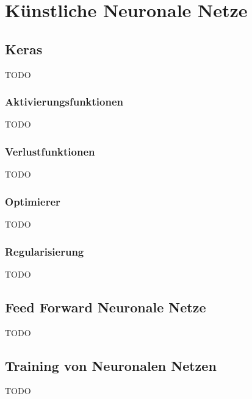 \chapter{Künstliche Neuronale Netze}

\section{Keras}
TODO

\subsection{Aktivierungsfunktionen}
TODO

\subsection{Verlustfunktionen}
TODO

\subsection{Optimierer}
TODO

\subsection{Regularisierung}
TODO

\section{Feed Forward Neuronale Netze}
TODO

\section{Training von Neuronalen Netzen}
TODO